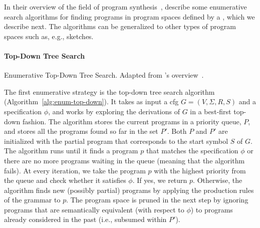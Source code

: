 In their overview of the field of program synthesis~\cite{Gulwani2017},
\citeauthor{Gulwani2017} describe some enumerative search algorithms for finding
programs in program spaces defined by a , which we describe
next.
The algorithms can be generalized to other types of program spaces such as,
e.g., sketches.

\paragraph{Top-Down Tree Search}
\label{sec:top-down-tree-search}

\begin{algorithm}
  \DontPrintSemicolon
  \LinesNotNumbered




  \caption{Enumerative Top-Down Tree Search.
    Adapted from \citeauthor{Gulwani2017}'s overview~\cite{Gulwani2017}.}
  \label{alg:enum-top-down}
\end{algorithm}

The first enumerative strategy is the top-down tree search algorithm
(Algorithm~\ref{alg:enum-top-down}).
It takes as input a \gls{cfg} $G = (V, \Sigma{}, R, S)$ and a specification
$\phi{}$, and works by exploring the derivations of $G$ in a best-first top-down
fashion.
The algorithm stores the current programs in a priority queue, $P$, and stores
all the programs found so far in the set $P'$.
Both $P$ and $P'$ are initialized with the partial program that corresponds to
the start symbol $S$ of $G$.
The algorithm runs until it finds a program $p$ that matches the specification
$\phi{}$ or there are no more programs waiting in the queue (meaning that the
algorithm fails).
At every iteration, we take the program $p$ with the highest priority from the
queue and check whether it satisfies $\phi{}$.
If yes, we return $p$.
Otherwise, the algorithm finds new (possibly partial) programs by applying the
production rules of the grammar to $p$.
The program space is pruned in the next step by ignoring programs that are
semantically equivalent (with respect to $\phi{}$) to programs already
considered in the past (i.e., subsumed within $P'$).

